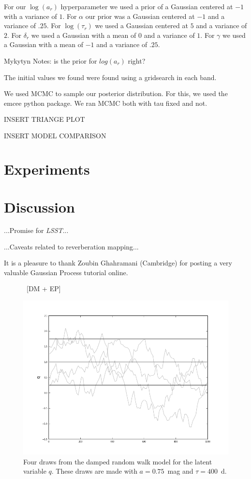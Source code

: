 \documentclass[letterpaper,12pt,preprint]{aastex}
\newcommand{\project}[1]{\textsl{#1}}
\newcommand{\lsst}{\project{LSST}}
\begin{document}
For our $\log(a_r)$ hyperparameter we used a prior of a Gaussian centered at $-1$ with a variance of $1$. For $\alpha$ our prior was a Gaussian centered at $-1$ and a variance of $.25$. For $\log(\tau_r)$ we used a Gaussian centered at $5$ and a variance of $2$. For $\delta_r$ we used a Gaussian with a mean of $0$ and a variance of $1$. For $\gamma$ we used a Gaussian with a mean of $-1$ and a variance of $.25$. 

Mykytyn Notes: is the prior for $log(a_r)$ right?

The initial values we found were found using a gridsearch in each band.


We used MCMC to sample our posterior distribution. For this, we used the emcee python package. We ran MCMC both with tau fixed and not. 

INSERT TRIANGE PLOT

INSERT MODEL COMPARISON


\section{Experiments}

\section{Discussion}

...Promise for \lsst...

...Caveats related to reverberation mapping...

It is a pleasure to thank Zoubin Ghahramani (Cambridge) for posting a
very valuable Gaussian Process tutorial online.

\clearpage
\begin{figure}
~[DM + EP]~
\caption{Four draws from the damped random walk model for the latent
  variable $q$.  These draws are made with $a=0.75$~mag and
  $\tau=400$~d.\label{fig:qdraws}}
\includegraphics [width=\textwidth]{latentvar.png}
\end{figure}
\end{document}
